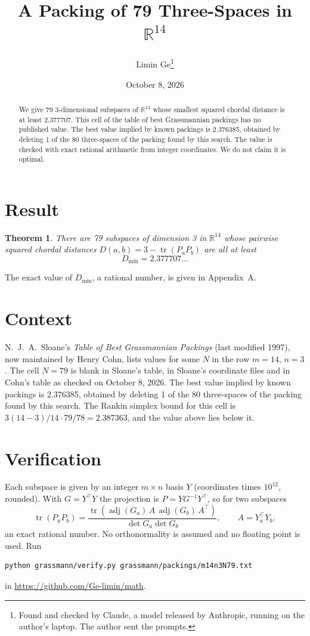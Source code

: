 \documentclass[11pt,a4paper]{article}
\title{A Packing of 79 Three-Spaces in $\mathbb{R}^{14}$}
\author{Limin Ge\thanks{Found and checked by Claude, a model released by Anthropic, running on the author's laptop. The author sent the prompts.}}
\date{October 8, 2026}
\newtheorem*{theorem}{Theorem}
\begin{document}
\maketitle
\begin{abstract}
We give 79 3-dimensional subspaces of $\mathbb{R}^{14}$ whose smallest squared chordal distance is at least 2.377707. This cell of the table of best Grassmannian packings has no published value. The best value implied by known packings is 2.376385, obtained by deleting 1 of the 80 three-spaces of the packing found by this search. The value is checked with exact rational arithmetic from integer coordinates. We do not claim it is optimal.
\end{abstract}

\section{Result}
\begin{theorem}
There are 79 subspaces of dimension 3 in $\mathbb{R}^{14}$ whose pairwise squared chordal distances $D(a,b) = 3 - \operatorname{tr}(P_aP_b)$ are all at least
\[ D_{\min} = 2.377707\ldots \]
\end{theorem}
The exact value of $D_{\min}$, a rational number, is given in Appendix~A.


\section{Context}
N.~J.~A.~Sloane's \emph{Table of Best Grassmannian Packings} (last modified 1997), now maintained by Henry Cohn, lists values for some $N$ in the row $m=14$, $n=3$. The cell $N=79$ is blank in Sloane's table, in Sloane's coordinate files and in Cohn's table as checked on October 8, 2026. The best value implied by known packings is 2.376385, obtained by deleting 1 of the 80 three-spaces of the packing found by this search. The Rankin simplex bound for this cell is $3(14-3)/14\cdot 79/78 = 2.387363$, and the value above lies below it.


\section{Verification}
Each subspace is given by an integer $m\times n$ basis $Y$ (coordinates times $10^{12}$, rounded). With $G=Y^\top Y$ the projection is $P=YG^{-1}Y^\top$, so for two subspaces
\[ \operatorname{tr}(P_aP_b)=\frac{\operatorname{tr}(\operatorname{adj}(G_a)\,A\,\operatorname{adj}(G_b)\,A^\top)}{\det G_a\det G_b},\qquad A=Y_a^\top Y_b, \]
an exact rational number. No orthonormality is assumed and no floating point is used. Run
\begin{verbatim}
python grassmann/verify.py grassmann/packings/m14n3N79.txt
\end{verbatim}
in \url{https://github.com/Ge-limin/math}.
\end{document}
